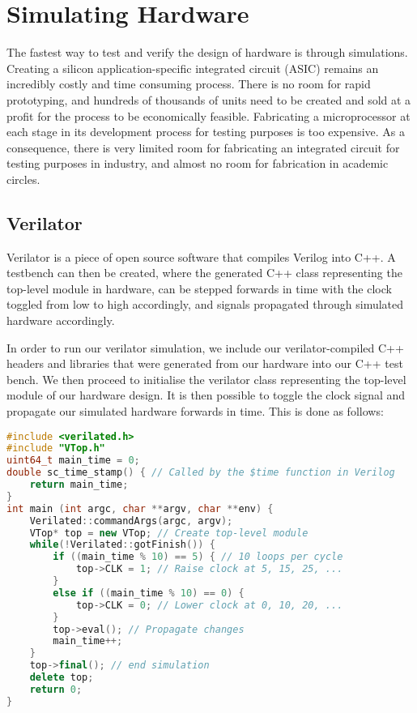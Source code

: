 \documentclass[a4paper,8pt]{report}
\begin{document}
\section{Simulating Hardware} 
The fastest way to test and verify the design of hardware is through simulations.
Creating a silicon application-specific integrated circuit (ASIC) remains an
incredibly costly and time consuming process.
There is no room for rapid prototyping, and hundreds of thousands of units need
to be created and sold at a profit for the process to be economically
feasible. Fabricating a microprocessor at each stage in its development process
for testing purposes is too expensive. As a consequence, there is very
limited room for fabricating an integrated circuit for testing purposes in
industry, and almost no room for fabrication in academic circles.

\subsection{Verilator}
Verilator is a piece of open source software that compiles Verilog into C++. A
testbench can then be created, where the generated C++ class representing the
top-level module in hardware, can be stepped forwards in time with the clock
toggled from low to high accordingly, and signals propagated through simulated
hardware accordingly.

In order to run our verilator simulation, we include our verilator-compiled C++
headers and libraries that were generated from our hardware into our C++ test
bench. We then proceed to initialise the verilator class representing the
top-level module of our hardware design. It is then possible to toggle the clock
signal and propagate our simulated hardware forwards in time. This is done as
follows:
\begin{lstlisting}[language=C++,style=customcpp]
#include <verilated.h>
#include "VTop.h"
uint64_t main_time = 0;
double sc_time_stamp() { // Called by the $time function in Verilog
    return main_time;
}
int main (int argc, char **argv, char **env) {
    Verilated::commandArgs(argc, argv);
    VTop* top = new VTop; // Create top-level module
    while(!Verilated::gotFinish()) {
        if ((main_time % 10) == 5) { // 10 loops per cycle
            top->CLK = 1; // Raise clock at 5, 15, 25, ...
        }
        else if ((main_time % 10) == 0) {
            top->CLK = 0; // Lower clock at 0, 10, 20, ...
        }
        top->eval(); // Propagate changes
        main_time++;
    }
    top->final(); // end simulation
    delete top;
    return 0;
}

\end{lstlisting}
\end{document}
